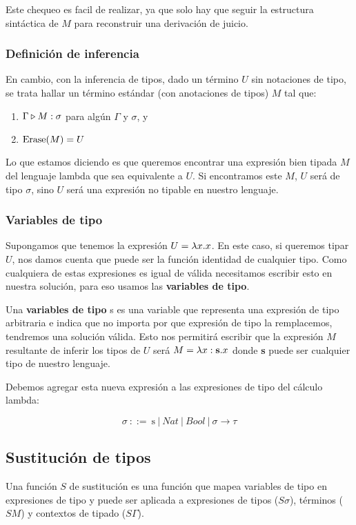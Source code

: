 Este chequeo  es facil de realizar, ya que solo hay que seguir la estructura sintáctica de $M$ para reconstruir una derivación de juicio. 

\subsubsection*{Definición de inferencia}
En cambio, con la inferencia de tipos, dado un término $U$ sin notaciones de tipo, se trata hallar un término estándar (con anotaciones de tipos) $M$ tal que:
\begin{enumerate}
\item $\Gamma\triangleright M : \sigma$ para algún $\Gamma$ y $\sigma$, y
\item $\operatorname{Erase}(M) = U$
\end{enumerate}

Lo que estamos diciendo es que queremos encontrar una expresión bien tipada $M$ del lenguaje lambda que sea equivalente a $U$. Si encontramos este $M$, $U$ será de tipo $\sigma$, sino $U$ será una expresión no tipable en nuestro lenguaje.


\subsubsection{Variables de tipo}
Supongamos que tenemos la expresión $U = \lambda x. x$. En este caso, si queremos tipar $U$, nos damos cuenta que puede ser la función identidad de cualquier tipo. Como cualquiera de estas expresiones es igual de válida necesitamos escribir esto en nuestra solución, para eso usamos las \textbf{variables de tipo}.

Una \textbf{variables de tipo} s es una variable que representa una expresión de tipo arbitraria e indica que no importa por que expresión de tipo la remplacemos, tendremos una solución válida. Esto nos permitirá escribir que la expresión $M$ resultante de inferir los tipos de $U$ será $M=\lambda x: \textbf{s} . x$ donde \textbf{s} puede ser cualquier tipo de nuestro lenguaje.

Debemos agregar esta nueva expresión a las expresiones  de tipo del cálculo lambda:

$$\sigma~::=~\text{s}~|~Nat~|~Bool~|~\sigma\to\tau$$


\subsection{Sustitución de tipos}
Una función $S$ de sustitución es una función que mapea variables de tipo en expresiones de tipo y puede ser aplicada a expresiones de tipos ($S\sigma$), términos ($SM$) y contextos de tipado ($S\Gamma$).


